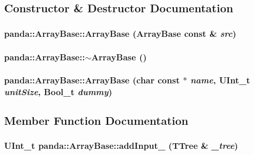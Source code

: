 \subsection{Constructor \& Destructor Documentation}
\hypertarget{classpanda_1_1ArrayBase_abbf74589a80e3a9b7eb806c3449fd1f7}{
\subsubsection[{ArrayBase}]{\setlength{\rightskip}{0pt plus 5cm}panda::ArrayBase::ArrayBase ({\bf ArrayBase} const \& {\em src})}}
\label{classpanda_1_1ArrayBase_abbf74589a80e3a9b7eb806c3449fd1f7}
\hypertarget{classpanda_1_1ArrayBase_a4cc6e7002b345f1f297a28c6dc1b2fbe}{
\subsubsection[{$\sim$ArrayBase}]{\setlength{\rightskip}{0pt plus 5cm}panda::ArrayBase::$\sim$ArrayBase ()}}
\label{classpanda_1_1ArrayBase_a4cc6e7002b345f1f297a28c6dc1b2fbe}
\hypertarget{classpanda_1_1ArrayBase_a9d276f11ddeb4c84cb9f1fa9b3a1c7c9}{
\subsubsection[{ArrayBase}]{\setlength{\rightskip}{0pt plus 5cm}panda::ArrayBase::ArrayBase (char const $\ast$ {\em name}, \/  UInt\_\-t {\em unitSize}, \/  Bool\_\-t {\em dummy})}}
\label{classpanda_1_1ArrayBase_a9d276f11ddeb4c84cb9f1fa9b3a1c7c9}


\subsection{Member Function Documentation}
\hypertarget{classpanda_1_1ArrayBase_af7f0227b78e78aa597170e23d471d454}{
\subsubsection[{addInput\_\-}]{\setlength{\rightskip}{0pt plus 5cm}UInt\_\-t panda::ArrayBase::addInput\_\- (TTree \& {\em \_\-tree})}}
\label{classpanda_1_1ArrayBase_af7f0227b78e78aa597170e23d471d454}


